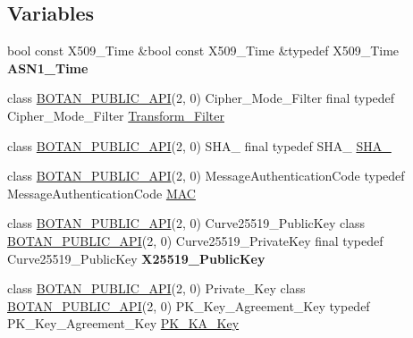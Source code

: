 \subsection*{Variables}
\begin{DoxyCompactItemize}
\item 
\mbox{\label{namespace_botan_a7ed1a645917b63520e98e9ab91aa021e}} 
bool const X509\+\_\+\+Time \&bool const X509\+\_\+\+Time \&typedef X509\+\_\+\+Time {\bfseries A\+S\+N1\+\_\+\+Time}
\item 
class \mbox{\hyperlink{namespace_botan_a6b9388030d872e586a4655b776ac9501}{B\+O\+T\+A\+N\+\_\+\+P\+U\+B\+L\+I\+C\+\_\+\+A\+PI}}(2, 0) Cipher\+\_\+\+Mode\+\_\+\+Filter final typedef Cipher\+\_\+\+Mode\+\_\+\+Filter \mbox{\hyperlink{namespace_botan_a021ffc520728602cd2f027a40b68bc5f}{Transform\+\_\+\+Filter}}
\item 
class \mbox{\hyperlink{namespace_botan_a6b9388030d872e586a4655b776ac9501}{B\+O\+T\+A\+N\+\_\+\+P\+U\+B\+L\+I\+C\+\_\+\+A\+PI}}(2, 0) S\+H\+A\+\_ final typedef S\+H\+A\+\_ \mbox{\hyperlink{namespace_botan_a7aedf36a60e3180255517925fa25efca}{S\+H\+A\+\_}}
\item 
class \mbox{\hyperlink{namespace_botan_a6b9388030d872e586a4655b776ac9501}{B\+O\+T\+A\+N\+\_\+\+P\+U\+B\+L\+I\+C\+\_\+\+A\+PI}}(2, 0) Message\+Authentication\+Code typedef Message\+Authentication\+Code \mbox{\hyperlink{namespace_botan_aad9020384b0dc79f1bc8dcc59d5ee6fc}{M\+AC}}
\item 
\mbox{\label{namespace_botan_a3375bcbe930557f2b1cd206c0f5cf43b}} 
class \mbox{\hyperlink{namespace_botan_a6b9388030d872e586a4655b776ac9501}{B\+O\+T\+A\+N\+\_\+\+P\+U\+B\+L\+I\+C\+\_\+\+A\+PI}}(2, 0) Curve25519\+\_\+\+Public\+Key class \mbox{\hyperlink{namespace_botan_a6b9388030d872e586a4655b776ac9501}{B\+O\+T\+A\+N\+\_\+\+P\+U\+B\+L\+I\+C\+\_\+\+A\+PI}}(2, 0) Curve25519\+\_\+\+Private\+Key final typedef Curve25519\+\_\+\+Public\+Key {\bfseries X25519\+\_\+\+Public\+Key}
\item 
class \mbox{\hyperlink{namespace_botan_a6b9388030d872e586a4655b776ac9501}{B\+O\+T\+A\+N\+\_\+\+P\+U\+B\+L\+I\+C\+\_\+\+A\+PI}}(2, 0) Private\+\_\+\+Key class \mbox{\hyperlink{namespace_botan_a6b9388030d872e586a4655b776ac9501}{B\+O\+T\+A\+N\+\_\+\+P\+U\+B\+L\+I\+C\+\_\+\+A\+PI}}(2, 0) P\+K\+\_\+\+Key\+\_\+\+Agreement\+\_\+\+Key typedef P\+K\+\_\+\+Key\+\_\+\+Agreement\+\_\+\+Key \mbox{\hyperlink{namespace_botan_a137fc6f2c61b1ee506513b92b09618c6}{P\+K\+\_\+\+K\+A\+\_\+\+Key}}

\end{DoxyCompactItemize}
